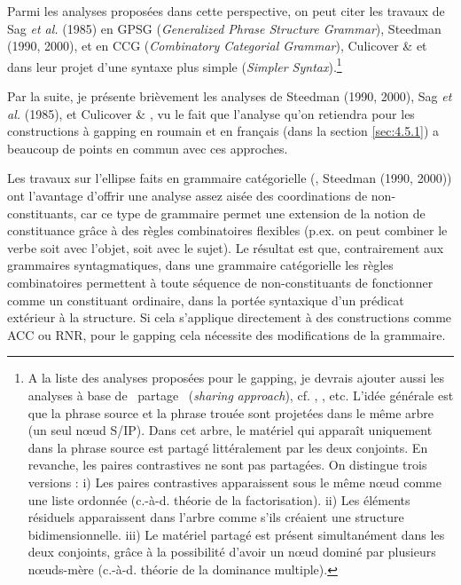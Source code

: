 Parmi les analyses proposées dans cette perspective, on peut citer les travaux de Sag \textit{et al.} (1985) en GPSG (\textit{Generalized Phrase Structure Grammar}), Steedman (1990, 2000), \citet{Gardent1991} et \citet{Hoyt2008} en CCG (\textit{Combinatory Categorial Grammar}), Culicover \& \citet{Jackendoff2005} et \citet{Culicover2009} dans leur projet d'une syntaxe plus simple (\textit{Simpler Syntax}).\footnote{A la liste des analyses proposées pour le gapping, je devrais ajouter aussi les analyses à base de {\guillemotleft}~partage~{\guillemotright} (\textit{sharing} \textit{approach}), cf. \citet{Goodall1987}, \citet{Moltmann1992}, etc. L'idée générale est que la phrase source et la phrase trouée sont projetées dans le même arbre (un seul n{\oe}ud S/IP). Dans cet arbre, le matériel qui apparaît uniquement dans la phrase source est partagé littéralement par les deux conjoints. En revanche, les paires contrastives ne sont pas partagées. On distingue trois versions : i) Les paires contrastives apparaissent sous le même n{\oe}ud comme une liste ordonnée (c.-à-d. théorie de la factorisation). ii) Les éléments résiduels apparaissent dans l'arbre comme s'ils créaient une structure bidimensionnelle. iii) Le matériel partagé est présent simultanément dans les deux conjoints, grâce à la possibilité d'avoir un n{\oe}ud dominé par plusieurs n{\oe}uds-mère (c.-à-d. théorie de la dominance multiple).} 

Par la suite, je présente brièvement les analyses de Steedman (1990, 2000), Sag \textit{et al.} (1985), \citet{Gardent1991} et Culicover \& \citet{Jackendoff2005}, vu le fait que l'analyse qu'on retiendra pour les constructions à gapping en roumain et en français (dans la section \ref{sec:4.5.1}) a beaucoup de points en commun avec ces approches. 

Les travaux sur l'ellipse faits en grammaire catégorielle (\citet{Dowty1988}, Steedman (1990, 2000)) ont l'avantage d'offrir une analyse assez aisée des coordinations de non-constituants, car ce type de grammaire permet une extension de la notion de constituance grâce à des règles combinatoires flexibles (p.ex. on peut combiner le verbe soit avec l'objet, soit avec le sujet). Le résultat est que, contrairement aux grammaires syntagmatiques, dans une grammaire catégorielle les règles combinatoires permettent à toute séquence de non-constituants de fonctionner comme un constituant ordinaire, dans la portée syntaxique d'un prédicat extérieur à la structure. Si cela s'applique directement à des constructions comme ACC ou RNR, pour le gapping cela nécessite des modifications de la grammaire. 

